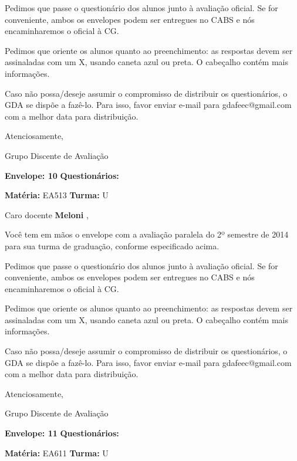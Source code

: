 \documentclass[a5paper]{letter}
\begin{document}
	Pedimos que passe o questionário dos alunos junto à avaliação oficial. Se for conveniente, ambos os envelopes podem ser entregues no CABS e nós encaminharemos o oficial à CG.

Pedimos que oriente os alunos quanto ao preenchimento: as respostas devem ser assinaladas com um X, usando caneta azul ou preta. O cabeçalho contém mais informações.

	Caso não possa/deseje assumir o compromisso de distribuir os questionários, o GDA se dispõe a fazê-lo. Para isso, favor enviar e-mail para gdafeec@gmail.com com a melhor data para distribuição.


Atenciosamente, 

Grupo Discente de Avaliação

\vspace{0.5cm}

{\bf Envelope: 10 }		\hfill	{\bf Questionários:} \hspace{2cm}

\newpage
\thispagestyle{empty}

\hfill {\bf Matéria:} EA513 {\bf Turma:} U

Caro docente {\bf Meloni }, 

	Você tem em mãos o envelope com a avaliação paralela do 2º semestre de 2014 para sua turma de graduação, conforme especificado acima.

	Pedimos que passe o questionário dos alunos junto à avaliação oficial. Se for conveniente, ambos os envelopes podem ser entregues no CABS e nós encaminharemos o oficial à CG.

Pedimos que oriente os alunos quanto ao preenchimento: as respostas devem ser assinaladas com um X, usando caneta azul ou preta. O cabeçalho contém mais informações.

	Caso não possa/deseje assumir o compromisso de distribuir os questionários, o GDA se dispõe a fazê-lo. Para isso, favor enviar e-mail para gdafeec@gmail.com com a melhor data para distribuição.


Atenciosamente, 

Grupo Discente de Avaliação

\vspace{0.5cm}

{\bf Envelope: 11 }		\hfill	{\bf Questionários:} \hspace{2cm}

\newpage
\thispagestyle{empty}

\hfill {\bf Matéria:} EA611 {\bf Turma:} U
\end{document}
